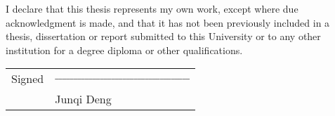 


\begin{declaration}        %

I declare that this thesis represents my own work, except where due acknowledgment is made, 
	and that it has not been previously included in a thesis, dissertation or report submitted 
	to this University or to any other institution for a degree diploma or other qualifications.\

	\vspace*{1in}
	\begin{tabular}{rl}     
	Signed&$\_\_\_\_\_\_\_\_\_\_\_\_\_\_\_\_\_\_\_\_\_\_\_\_\_\_\_\_\_\_\_\_\_\_\_\_$\\
	&{Junqi Deng} \\
	\end{tabular}


\end{declaration}


